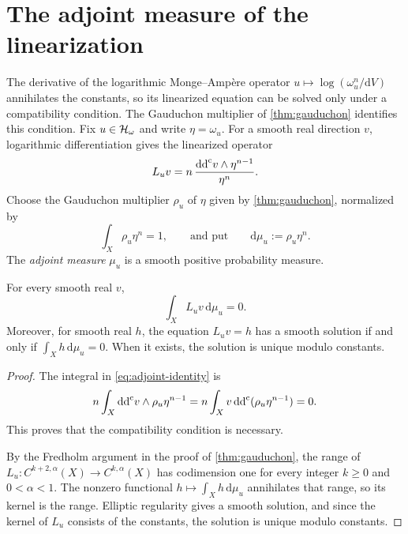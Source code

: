 


\section{The adjoint measure of the linearization}

The derivative of the logarithmic Monge--Amp\`ere operator $u\mapsto\log(\omega_u^n/\mathrm dV)$ annihilates the constants, so its linearized equation can be solved only under a compatibility condition. The Gauduchon multiplier of \cref{thm:gauduchon} identifies this condition. Fix $u\in\mathcal H_\omega$ and write $\eta=\omega_u$. For a smooth real direction $v$, logarithmic differentiation gives the linearized operator
\begin{equation}\label{eq:linearized-ma}
 L_u v=n\,\frac{\mathrm{dd}^{\mathrm{c}} v\wedge\eta^{n-1}}{\eta^n}.
\end{equation}
Choose the Gauduchon multiplier $\rho_u$ of $\eta$ given by \cref{thm:gauduchon}, normalized by
\[
 \int_X\rho_u\eta^n=1,
 \qquad\text{and put}\qquad \mathrm{d}\mu_u:=\rho_u\eta^n.
\]
The \emph{adjoint measure} $\mu_u$ is a smooth positive probability measure.

\begin{proposition}\label{prop:adjoint-gauduchon}
For every smooth real $v$,
\begin{equation}\label{eq:adjoint-identity}
 \int_X L_uv\,\mathrm{d}\mu_u=0.
\end{equation}
Moreover, for smooth real $h$, the equation $L_uv=h$ has a smooth solution if and only if $\int_Xh\,\mathrm{d}\mu_u=0$. When it exists, the solution is unique modulo constants.
\end{proposition}
\begin{proof}
The integral in \eqref{eq:adjoint-identity} is
\[
 n\int_X\mathrm{dd}^{\mathrm{c}} v\wedge\rho_u\eta^{n-1}
 =n\int_Xv\,\mathrm{dd}^{\mathrm{c}}(\rho_u\eta^{n-1})=0.
\]
This proves that the compatibility condition is necessary.

By the Fredholm argument in the proof of \cref{thm:gauduchon}, the range of $L_u\colon C^{k+2,\alpha}(X)\to C^{k,\alpha}(X)$ has codimension one for every integer $k\geq0$ and $0<\alpha<1$. The nonzero functional $h\mapsto\int_Xh\,\mathrm{d}\mu_u$ annihilates that range, so its kernel is the range. Elliptic regularity gives a smooth solution, and since the kernel of $L_u$ consists of the constants, the solution is unique modulo constants.
\end{proof}

